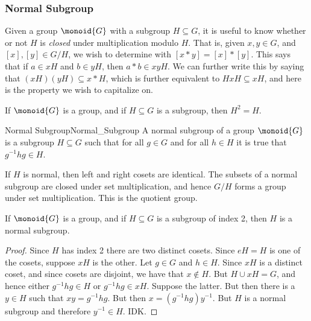 \documentclass{article}                                                        %
\begin{document}
            \subsubsection{Normal Subgroup}
                Given a group $\monoid{G}$ with a subgroup $H\subseteq{G}$, it
                is useful to know whether or not $H$ is \textit{closed} under
                multiplication modulo $H$. That is, given $x,y\in{G}$, and
                $[x],[y]\in{G}/H$, we wish to determine with $[x*y]=[x]*[y]$.
                This says that if $a\in{x}H$ and $b\in{y}H$, then $a*b\in{x}yH$.
                We can further write this by saying that
                $(xH)(yH)\subseteq{x}*H$, which is further equivalent to
                $HxH\subseteq{x}H$, and here is the property we wish to
                capitalize on.
                \begin{theorem}
                    If $\monoid{G}$ is a group, and if $H\subseteq{G}$ is a
                    subgroup, then $H^{2}=H$.
                \end{theorem}
                \begin{fdefinition}{Normal Subgroup}{Normal_Subgroup}
                    A normal subgroup of a group $\monoid{G}$ is a subgroup
                    $H\subseteq{G}$ such that for all $g\in{G}$ and for all
                    $h\in{H}$ it is true that $g^{\minus{1}}hg\in{H}$.
                \end{fdefinition}
                If $H$ is normal, then left and right cosets are identical.
                The subsets of a normal subgroup are closed under set
                multiplication, and hence $G/H$ forms a group under set
                multiplication. This is the quotient group.
                \begin{theorem}
                    If $\monoid{G}$ is a group, and if $H\subseteq{G}$ is a
                    subgroup of index 2, then $H$ is a normal subgroup.
                \end{theorem}
                \begin{proof}
                    Since $H$ has index 2 there are two distinct cosets. Since
                    $eH=H$ is one of the cosets, suppose $xH$ is the other.
                    Let $g\in{G}$ and $h\in{H}$. Since $xH$ is a distinct coset,
                    and since cosets are disjoint, we have that $x\notin{H}$.
                    But $H\cup{x}H=G$, and hence either $g^{\minus{1}}hg\in{H}$
                    or $g^{\minus{1}}hg\in{x}H$. Suppose the latter. But then
                    there is a $y\in{H}$ such that $xy=g^{\minus{1}}hg$.
                    But then $x=(g^{\minus{1}}hg)y^{\minus{1}}$. But $H$ is a
                    normal subgroup and therefore $y^{\minus{1}}\in{H}$. IDK.
                \end{proof}
\end{document}
